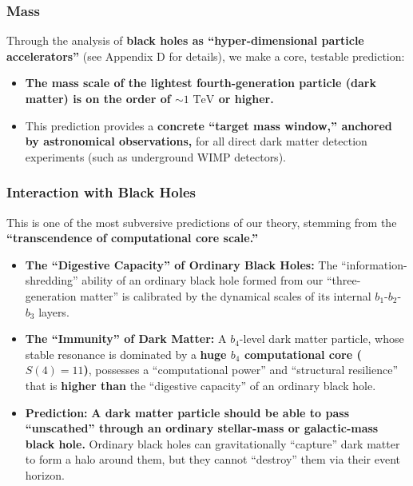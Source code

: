\documentclass[11pt, a4paper]{article}
\begin{document}
\subsubsection{Mass}
Through the analysis of \textbf{black holes as ``hyper-dimensional particle accelerators''} (see Appendix D for details), we make a core, testable prediction:
\begin{itemize}
    \item \textbf{The mass scale of the lightest fourth-generation particle (dark matter) is on the order of $\sim 1 \text{ TeV}$ or higher.}
    \item This prediction provides a \textbf{concrete ``target mass window,'' anchored by astronomical observations,} for all direct dark matter detection experiments (such as underground WIMP detectors).
\end{itemize}

\subsubsection{Interaction with Black Holes}
This is one of the most subversive predictions of our theory, stemming from the \textbf{``transcendence of computational core scale.''}
\begin{itemize}
    \item \textbf{The ``Digestive Capacity'' of Ordinary Black Holes:} The ``information-shredding'' ability of an ordinary black hole formed from our ``three-generation matter'' is calibrated by the dynamical scales of its internal $b_1$-$b_2$-$b_3$ layers.
    \item \textbf{The ``Immunity'' of Dark Matter:} A $b_4$-level dark matter particle, whose stable resonance is dominated by a \textbf{huge $b_4$ computational core ($S(4)=11$)}, possesses a ``computational power'' and ``structural resilience'' that is \textbf{higher than} the ``digestive capacity'' of an ordinary black hole.
    \item \textbf{Prediction:} \textbf{A dark matter particle should be able to pass ``unscathed'' through an ordinary stellar-mass or galactic-mass black hole.} Ordinary black holes can gravitationally ``capture'' dark matter to form a halo around them, but they cannot ``destroy'' them via their event horizon.
\end{itemize}
\end{document}

